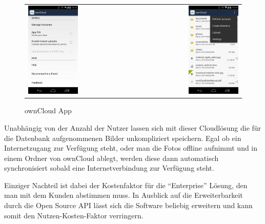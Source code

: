 \begin{figure}[htb]
	\begin{tabular}{l r}
		\includegraphics[width=0.49\textwidth]{Bilder/ownCloud-mobile1}
		&
		\includegraphics[width=0.49\textwidth]{Bilder/ownCloud-mobile2}
	\end{tabular}
	\caption{ownCloud App}
	\label{Websitemobil}
\end{figure}

\hspace{2 cm}

Unabhängig von der Anzahl der Nutzer lassen sich mit dieser Cloudlösung die für die Datenbank aufgenommenen Bilder unkompliziert speichern. Egal ob ein Internetzugang zur Verfügung steht, oder man die Fotos offline aufnimmt und in einem Ordner von ownCloud ablegt, werden diese dann automatisch synchronisiert sobald eine Internetverbindung zur Verfügung steht.

Einziger Nachteil ist dabei der Kostenfaktor für die ``Enterprise'' Lösung, den man mit dem Kunden abstimmen muss. In Ausblick auf die Erweiterbarkeit durch die Open Source \ac{API} lässt sich die Software beliebig erweitern und kann somit den Nutzen-Kosten-Faktor verringern.
